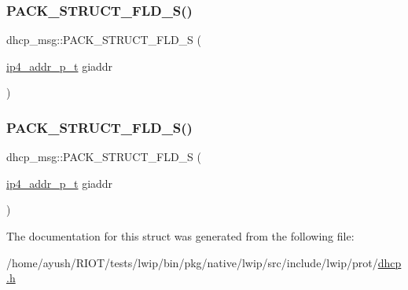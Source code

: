 \mbox{\label{structdhcp__msg_a26c28cde7f50c104ff1615fc35a38203}} 
\subsubsection{\texorpdfstring{P\+A\+C\+K\+\_\+\+S\+T\+R\+U\+C\+T\+\_\+\+F\+L\+D\+\_\+\+S()}{PACK\_STRUCT\_FLD\_S()}\hspace{0.1cm}{\footnotesize\ttfamily [7/8]}}
{\footnotesize\ttfamily dhcp\+\_\+msg\+::\+P\+A\+C\+K\+\_\+\+S\+T\+R\+U\+C\+T\+\_\+\+F\+L\+D\+\_\+S (\begin{DoxyParamCaption}\item[{\hyperlink{native_2lwip_2src_2include_2lwip_2prot_2ip4_8h_ae5011654fcbadf6b6582b8d49446107f}{ip4\+\_\+addr\+\_\+p\+\_\+t}}]{giaddr }\end{DoxyParamCaption})}

\mbox{\label{structdhcp__msg_a26c28cde7f50c104ff1615fc35a38203}} 
\subsubsection{\texorpdfstring{P\+A\+C\+K\+\_\+\+S\+T\+R\+U\+C\+T\+\_\+\+F\+L\+D\+\_\+\+S()}{PACK\_STRUCT\_FLD\_S()}\hspace{0.1cm}{\footnotesize\ttfamily [8/8]}}
{\footnotesize\ttfamily dhcp\+\_\+msg\+::\+P\+A\+C\+K\+\_\+\+S\+T\+R\+U\+C\+T\+\_\+\+F\+L\+D\+\_\+S (\begin{DoxyParamCaption}\item[{\hyperlink{native_2lwip_2src_2include_2lwip_2prot_2ip4_8h_ae5011654fcbadf6b6582b8d49446107f}{ip4\+\_\+addr\+\_\+p\+\_\+t}}]{giaddr }\end{DoxyParamCaption})}



The documentation for this struct was generated from the following file\+:\begin{DoxyCompactItemize}
\item 
/home/ayush/\+R\+I\+O\+T/tests/lwip/bin/pkg/native/lwip/src/include/lwip/prot/\hyperlink{native_2lwip_2src_2include_2lwip_2prot_2dhcp_8h}{dhcp.\+h}\end{DoxyCompactItemize}
